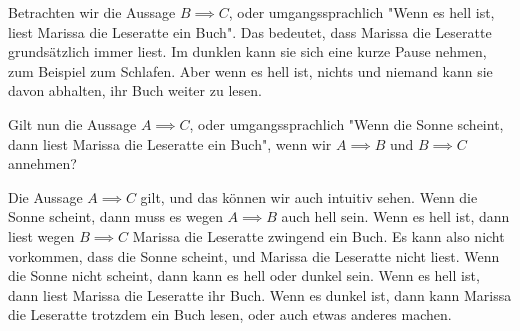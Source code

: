 \documentclass[
	12pt, %
	german, %
]{fphw}
\begin{document}
Betrachten wir die Aussage \(B \implies C\), oder umgangssprachlich "Wenn es hell ist, liest Marissa die Leseratte ein Buch". Das bedeutet, dass Marissa die Leseratte grundsätzlich immer liest. Im dunklen kann sie sich eine kurze Pause nehmen, zum Beispiel zum Schlafen. Aber wenn es hell ist, nichts und niemand kann sie davon abhalten, ihr Buch weiter zu lesen.

Gilt nun die Aussage \(A \implies C\), oder umgangssprachlich "Wenn die Sonne scheint, dann liest Marissa die Leseratte ein Buch", wenn wir \(A \implies B\) und \(B \implies C\) annehmen?

Die Aussage \(A \implies C\) gilt, und das können wir auch intuitiv sehen. Wenn die Sonne scheint, dann muss es wegen \(A \implies B\) auch hell sein. Wenn es hell ist, dann liest wegen \(B \implies C\) Marissa die Leseratte zwingend ein Buch. Es kann also nicht vorkommen, dass die Sonne scheint, und Marissa die Leseratte nicht liest.
Wenn die Sonne nicht scheint, dann kann es hell oder dunkel sein. Wenn es hell ist, dann liest Marissa die Leseratte ihr Buch. Wenn es dunkel ist, dann kann Marissa die Leseratte trotzdem ein Buch lesen, oder auch etwas anderes machen.
\end{document}
